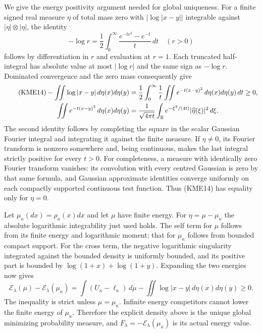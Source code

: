 \documentclass[11pt,a4paper]{article}
\begin{document}
We give the energy positivity argument needed for global uniqueness.
For a finite signed real measure $\eta$ of total mass zero with
$|\log|x-y||$ integrable against $|\eta|\otimes|\eta|$, the identity
\begin{equation}\tag{KME13}
 -\log r=\frac12\int_0^\infty
           \frac{e^{-tr^2}-e^{-t}}t\,dt\quad(r>0)
\end{equation}
follows by differentiation in $r$ and evaluation at $r=1$.
Each truncated half-integral has absolute value at most $|\log r|$
and the same sign as $-\log r$. Dominated convergence and the zero
mass consequently give
\begin{align}\tag{KME14}
 -\iint\log|x-y|\,d\eta(x)d\eta(y)
 &=\frac12\int_0^\infty\frac1t
               \iint e^{-t(x-y)^2}\,d\eta(x)d\eta(y)\,dt\geq0,\\
 \iint e^{-t(x-y)^2}\,d\eta(x)d\eta(y)
 &=\frac1{\sqrt{4\pi t}}\int_{\mathbb R}
       e^{-\xi^2/(4t)}|\widehat\eta(\xi)|^2\,d\xi.\notag
\end{align}
The second identity follows by completing the square in the scalar
Gaussian Fourier integral and integrating it against the finite measure.
If $\eta\ne0$, its Fourier transform is nonzero somewhere and, being
continuous, makes the last integral strictly positive for every $t>0$.
For completeness, a measure with identically zero Fourier transform
vanishes: its convolution with every centred Gaussian is zero by that
same formula, and Gaussian approximate identities converge uniformly on
each compactly supported continuous test function.  Thus (KME14)
has equality only for $\eta=0$.

Let $\mu_\kappa(dx)=\rho_\kappa(x)dx$ and let $\mu$ have finite energy.
For $\eta=\mu-\mu_\kappa$ the absolute logarithmic integrability just used
holds. The self term for $\mu$ follows from its finite energy and
logarithmic moment; that for $\mu_\kappa$ follows from bounded compact
support. For the cross term, the negative logarithmic singularity
integrated against the bounded density is uniformly bounded, and its
positive part is bounded by $\log(1+x)+\log(1+y)$.
Expanding the two energies now gives
\begin{equation}\tag{KME15}
 \mathcal E_\lambda(\mu)-\mathcal E_\lambda(\mu_\kappa)
 =\int(U_\kappa-\ell_\kappa)\,d\mu
                -\iint\log|x-y|\,d\eta(x)d\eta(y)\geq0.
\end{equation}
The inequality is strict unless $\mu=\mu_\kappa$. Infinite energy
competitors cannot lower the finite energy of $\mu_\kappa$. Therefore the
explicit density above is the unique global minimizing probability
measure, and $F_\lambda=-\mathcal E_\lambda(\mu_\kappa)$ is its actual
energy value.
\end{document}
